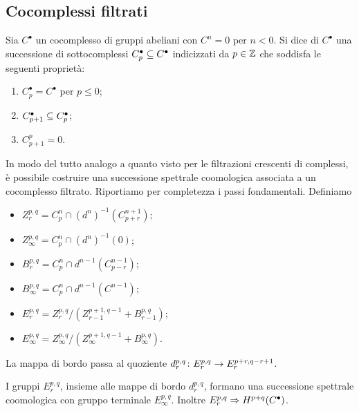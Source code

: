 \subsection{Cocomplessi filtrati}
\begin{definition}
Sia \(C^\bullet\) un cocomplesso di gruppi abeliani con \(C^n=0\) per \(n<0\). Si dice  di \(C^\bullet\) una successione di sottocomplessi \(C_p^\bullet\subseteq C^\bullet\) indicizzati da \(p\in\mathbb{Z}\) che soddisfa le seguenti proprietà:
\begin{enumerate}
\item \(C_p^\bullet=C^\bullet\) per \(p\le 0\);
\item \(C_{p+1}^\bullet\subseteq C_p^\bullet\);
\item \(C^p_{p+1}=0\).
\end{enumerate}
\end{definition}
In modo del tutto analogo a quanto visto per le filtrazioni crescenti di complessi, è possibile costruire una successione spettrale coomologica associata a un cocomplesso filtrato. Riportiamo per completezza i passi fondamentali. Definiamo
\begin{itemize}
\item \(Z^{p,q}_r=C_p^n\cap (d^n)^{-1}(C_{p+r}^{n+1})\);
\item \(Z^{p,q}_\infty=C_p^n\cap(d^n)^{-1}(0)\);
\item \(B^{p,q}_r=C_p^n\cap d^{n-1}(C_{p-r}^{n-1})\);
\item \(B^{p,q}_\infty=C_p^n\cap d^{n-1}(C^{n-1})\);
\item \(E^{p,q}_r=Z^{p,q}_r/(Z^{p+1,q-1}_{r-1}+B^{p,q}_{r-1})\);
\item \(E^{p,q}_\infty=Z^{p,q}_\infty/(Z^{p+1,q-1}_{\infty}+B^{p,q}_\infty)\).
\end{itemize}
La mappa di bordo passa al quoziente \(\map{d^{p,q}_r}{E^{p,q}_r}{E^{p+r,q-r+1}_r}\).
\begin{proposition}
I gruppi \(E^{p,q}_r\), insieme alle mappe di bordo \(d^{p,q}_r\), formano una successione spettrale coomologica con gruppo terminale \(E^{p,q}_\infty\). Inoltre \(E^{p,q}_r\Rightarrow H^{p+q}(C^\bullet)\).
\end{proposition}

